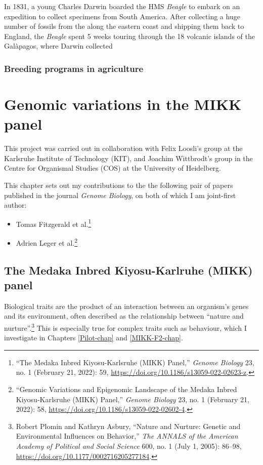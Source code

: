 \documentclass[
]{book}
\begin{document}
In 1831, a young Charles Darwin boarded the HMS \emph{Beagle} to embark on an expedition to collect specimens from South America. After collecting a huge number of fossils from the along the eastern coast and shipping them back to England, the \emph{Beagle} spent 5 weeks touring through the 18 volcanic islands of the Galàpagos, where Darwin collected

\hypertarget{breeding-programs-in-agriculture}{%
\subsection{Breeding programs in agriculture}\label{breeding-programs-in-agriculture}}

\hypertarget{MIKK-genomes-chap}{%
\chapter{Genomic variations in the MIKK panel}\label{MIKK-genomes-chap}}

This project was carried out in collaboration with Felix Loosli's group at the Karlsruhe Institute of Technology (KIT), and Joachim Wittbrodt's group in the Centre for Organismal Studies (COS) at the University of Heidelberg.

This chapter sets out my contributions to the the following pair of papers published in the journal \emph{Genome Biology}, on both of which I am joint-first author:

\begin{itemize}
\item
  Tomas Fitzgerald et al.\footnote{{``The {Medaka Inbred Kiyosu-Karlsruhe} ({MIKK}) Panel,''} \emph{Genome Biology} 23, no. 1 (February 21, 2022): 59, \url{https://doi.org/10.1186/s13059-022-02623-z}.}
\item
  Adrien Leger et al.\footnote{{``Genomic Variations and Epigenomic Landscape of the {Medaka Inbred Kiyosu-Karlsruhe} ({MIKK}) Panel,''} \emph{Genome Biology} 23, no. 1 (February 21, 2022): 58, \url{https://doi.org/10.1186/s13059-022-02602-4}.}
\end{itemize}

\hypertarget{the-medaka-inbred-kiyosu-karlruhe-mikk-panel}{%
\section{The Medaka Inbred Kiyosu-Karlruhe (MIKK) panel}\label{the-medaka-inbred-kiyosu-karlruhe-mikk-panel}}

Biological traits are the product of an interaction between an organism's genes and its environment, often described as the relationship between ``nature and nurture''.\footnote{Robert Plomin and Kathryn Asbury, {``Nature and {Nurture}: {Genetic} and {Environmental Influences} on {Behavior},''} \emph{The ANNALS of the American Academy of Political and Social Science} 600, no. 1 (July 1, 2005): 86--98, \url{https://doi.org/10.1177/0002716205277184}.} This is especially true for complex traits such as behaviour, which I investigate in Chapters \ref{Pilot-chap} and \ref{MIKK-F2-chap}.
\end{document}
